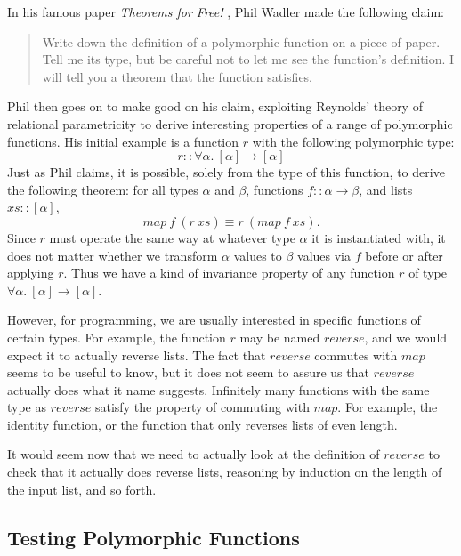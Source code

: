 \documentclass{llncs}
\begin{document}
In his famous paper \emph{Theorems for Free!}
\cite{DBLP:conf/fpca/Wadler89}, Phil Wadler made the following claim:
\begin{quotation}
  \noindent
  Write down the definition of a polymorphic function on a piece of
  paper. Tell me its type, but be careful not to let me see the
  function's definition. I will tell you a theorem that the function
  satisfies.
\end{quotation}
Phil then goes on to make good on his claim, exploiting Reynolds'
theory of relational parametricity \cite{DBLP:conf/ifip/Reynolds83} to
derive interesting properties of a range of polymorphic functions. His
initial example is a function $r$ with the following polymorphic type:
\begin{displaymath}
  \mathit{r} :: \forall \alpha.~[\alpha] \to [\alpha]
\end{displaymath}
Just as Phil claims, it is possible, solely from the type of this
function, to derive the following theorem: for all types $\alpha$ and
$\beta$, functions $f :: \alpha \to \beta$, and lists
$\mathit{xs} :: [\alpha]$,
\begin{displaymath}
  \mathit{map}~f~(\mathit{r}~\mathit{xs}) \equiv \mathit{r}~(\mathit{map}~f~\mathit{xs}).
\end{displaymath}
Since $\mathit{r}$ must operate the same way at whatever type $\alpha$
it is instantiated with, it does not matter whether we transform
$\alpha$ values to $\beta$ values via $f$ before or after applying
$\mathit{r}$. Thus we have a kind of invariance property of any
function $r$ of type $\forall \alpha.~[\alpha] \to [\alpha]$.

However, for programming, we are usually interested in specific
functions of certain types. For example, the function $r$ may be named
$\mathit{reverse}$, and we would expect it to actually reverse
lists. The fact that $\mathit{reverse}$ commutes with $\mathit{map}$
seems to be useful to know, but it does not seem to assure us that
$\mathit{reverse}$ actually does what it name suggests. Infinitely
many functions with the same type as $\mathit{reverse}$ satisfy the
property of commuting with $\mathit{map}$. For example, the identity
function, or the function that only reverses lists of even length.

It would seem now that we need to actually look at the definition of
$\mathit{reverse}$ to check that it actually does reverse lists,
reasoning by induction on the length of the input list, and so forth.

\subsection{Testing Polymorphic Functions}
\end{document}
